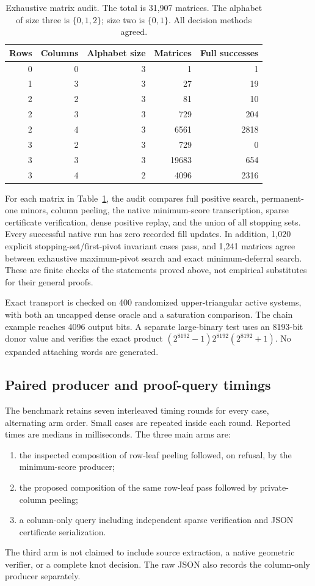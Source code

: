 \documentclass[11pt]{article}
\theoremstyle{definition}\newtheorem{definition}[theorem]{Definition}
\theoremstyle{remark}\newtheorem{remark}[theorem]{Remark}
\begin{document}
\begin{table}[htbp]
\centering
\begin{tabular}{rrrrr}
\toprule
Rows & Columns & Alphabet size & Matrices & Full successes\\
\midrule
0&0&3&1&1\\
1&3&3&27&19\\
2&2&3&81&10\\
2&3&3&729&204\\
2&4&3&6561&2818\\
3&2&3&729&0\\
3&3&3&19683&654\\
3&4&2&4096&2316\\
\bottomrule
\end{tabular}
\caption{Exhaustive matrix audit. The total is 31,907 matrices. The alphabet of size three is $\{0,1,2\}$; size two is $\{0,1\}$. All decision methods agreed.}
\label{tab:audit}
\end{table}

For each matrix in Table~\ref{tab:audit}, the audit compares full positive search, permanent-one minors, column peeling, the native minimum-score transcription, sparse certificate verification, dense positive replay, and the union of all stopping sets. Every successful native run has zero recorded fill updates. In addition, 1,020 explicit stopping-set/first-pivot invariant cases pass, and 1,241 matrices agree between exhaustive maximum-pivot search and exact minimum-deferral search. These are finite checks of the statements proved above, not empirical substitutes for their general proofs.

Exact transport is checked on 400 randomized upper-triangular active systems, with both an uncapped dense oracle and a saturation comparison. The chain example reaches 4096 output bits. A separate large-binary test uses an 8193-bit donor value and verifies the exact product $(2^{8192}-1)2^{8192}(2^{8192}+1)$. No expanded attaching words are generated.

\subsection{Paired producer and proof-query timings}
The benchmark retains seven interleaved timing rounds for every case, alternating arm order. Small cases are repeated inside each round. Reported times are medians in milliseconds. The three main arms are:
\begin{enumerate}[label=(\roman*)]
\item the inspected composition of row-leaf peeling followed, on refusal, by the minimum-score producer;
\item the proposed composition of the same row-leaf pass followed by private-column peeling;
\item a column-only query including independent sparse verification and JSON certificate serialization.
\end{enumerate}
The third arm is not claimed to include source extraction, a native geometric verifier, or a complete knot decision. The raw JSON also records the column-only producer separately.
\end{document}
